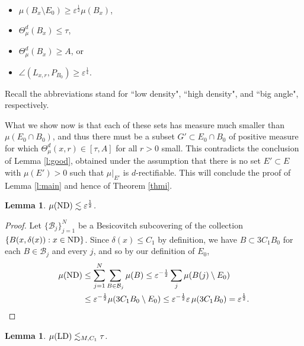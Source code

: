 \documentclass[11pt]{amsart}
\newcommand{\ve}{{\varepsilon}}
\newcommand{\HD}{{\mathsf{HD}}}
\newcommand{\LD}{{\mathsf{LD}}}
\newtheorem{lemma}[theorem]{Lemma}
\theoremstyle{definition}
\theoremstyle{remark}
\def\ND{{\rm ND}}
\def\LD{{\rm LD}}
\def\HD{{\rm HD}}
\def\BA{{\rm BA}}
\numberwithin{equation}{section}
\def\lec{\lesssim}
\def\lec{\lesssim}
\begin{document}


\begin{itemize}
	\item[\ND:] $\mu(B_{x}\setminus E_{0})\geq\ve^{\frac12} \mu(B_{x})$,
	\item[\LD:] %
	$\Theta_{\mu}^{d}(B_{x})\leq\tau$,
	\item[\HD:]  %
	$\Theta_{\mu}^{d}(B_{x})\ge A$, or
	\item[\BA:] %
	$\angle(L_{x,r},P_{B_{0}})\geq\ve^{\frac{1}{4}}$. 
\end{itemize}

\noindent Recall the abbreviations stand for ``low density", ``high density", and ``big angle", respectively. 

What we show now is that each of these sets has measure much smaller than $\mu(E_{0}\cap B_{0})$, and thus there must be a subset $G'\subset E_{0}\cap B_{0}$ of positive measure for which $\Theta^d_{\mu}(x,r) \in [\tau,A]$ for all $r>0$ small. 
This contradicts the conclusion of Lemma \ref{l:good}, obtained under the assumption that 
there is no set $E'\subset E$ with $\mu(E')>0$ such that $\mu|_{E'}$ is $d$-rectifiable. 
This will conclude the proof of
Lemma \ref{l:main} and hence of Theorem \ref{thmi}.

\begin{lemma}\label{lemld}
	$\mu(\ND)\lec \ve^{\frac{1}{2}}$. 
\end{lemma}

\begin{proof}
Let $\{\mathcal{B}_j\}_{j=1}^{N}$ be a Besicovitch subcovering of the collection $\{B(x,\delta(x)): x\in \ND\}$. Since $\delta(x)\leq C_1$ by definition,
 we have $B\subset 3C_1B_0$ for each $B\in \mathcal{B}_j$ and every $j$, and so by our definition of $E_{0}$,
\begin{align*}
	\mu(\ND) &
	\leq \sum_{j=1}^N \sum_{B\in\mathcal{B}_j}\mu(B)
	\leq\ve^{-\frac{1}{2}} \sum_{j}\mu( B(j)\setminus E_{0})\\&
	\leq \ve^{-\frac{1}{2}} \mu(3C_1B_{0}\setminus E_{0})
	\leq \ve^{-\frac{1}{2}} \ve\, \mu(3C_1B_{0}) = \ve^{\frac{1}{2}}. 
\end{align*}
\end{proof}

\begin{lemma}\label{l:LD}
	$\mu(\LD)\lec_{M,C_1} \tau$. 
\end{lemma}
\end{document}
